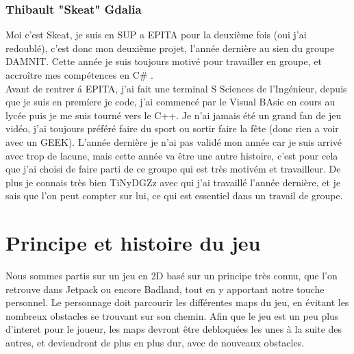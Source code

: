 \documentclass [11pt]{report}
\begin{document}
	
		
		
		\subsection {Thibault "Skeat" Gdalia}

			Moi c'est Skeat, je suis en SUP a EPITA pour la deuxi\`eme fois (oui j'ai redoubl\'e),  c'est donc mon deuxi\`eme projet, l'ann\'ee derni\`ere au sien du groupe DAMNIT. Cette ann\'ee je suis toujours motiv\'e pour travailler en groupe, et accro\^itre mes comp\'etences en C\# . 
			\\ \indent  Avant de rentrer \'a EPITA, j'ai fait une terminal S Sciences de l'Ing\'enieur, depuis que je suis en prem\'iere je code, j'ai commenc\'e par le Visual BAsic en cours au lyc\'ee puis je me suis tourn\'e vers le C++. Je n'ai jamais \'et\'e un grand fan de jeu vid\'eo, j'ai toujours pr\'ef\'er\'e faire du sport ou sortir faire la f\^ete (donc rien a voir avec un GEEK). L'ann\'ee derni\`ere je n'ai pas valid\'e mon ann\'ee car je suis arriv\'e avec trop de lacune, mais cette ann\'ee va \^etre une autre histoire, c'est pour cela que j'ai choisi de faire parti de ce groupe qui est tr\`es motiv\'em et travailleur. De plus je connais tr\`es bien TiNyDGZz avec qui j'ai travaill\'e l'ann\'ee derni\`ere, et je sais que l'on peut compter sur lui, ce qui est essentiel dans un travail de groupe.\\\vspace{10mm}
	
	

\chapter{Principe et histoire du jeu}

\indent Nous sommes partis sur un jeu en 2D bas\'e sur un principe tr\`es connu, que l'on retrouve dans Jetpack ou encore Badland, tout en y apportant notre touche personnel. Le personnage doit parcourir les différentes maps du jeu, en évitant les nombreux obstacles se trouvant sur son chemin. Afin que le jeu est un peu plus d'interet pour le joueur, les maps devront être debloquées les unes à la suite des autres, et deviendront de plus en plus dur, avec de nouveaux obstacles.\\
\end{document}
